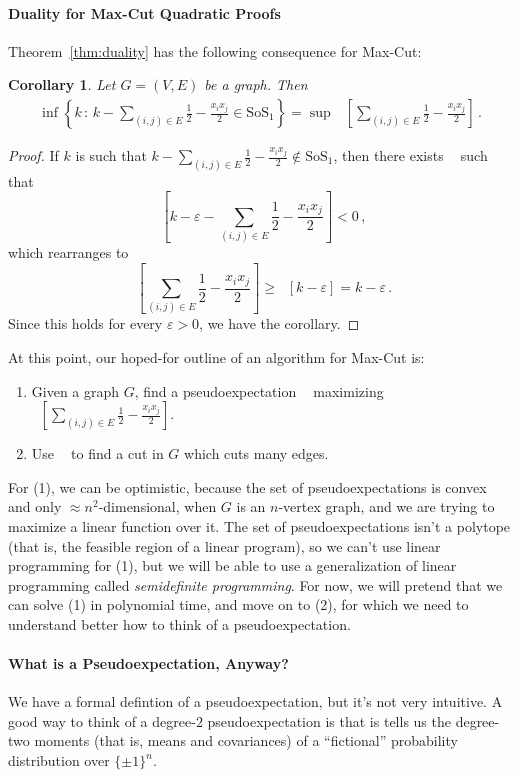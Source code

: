 \documentclass[11pt]{article}
\newtheorem{corollary}[theorem]{Corollary}
\newcommand{\brac}[1]{\left[ #1 \right]}
\renewcommand{\epsilon}{\varepsilon}
\newcommand{\eps}{\epsilon}
\DeclareMathOperator{\pE}{\widetilde{\mathbb{E}}} %
\newcommand{\SoS}{\text{SoS}}
\begin{document}
\paragraph{Duality for Max-Cut Quadratic Proofs}
Theorem~\ref{thm:duality} has the following consequence for Max-Cut:
\begin{corollary}
Let $G = (V,E)$ be a graph.
Then
\begin{align*}
  \inf \left \{ k \, : \,  k - \sum_{(i,j) \in E} \frac 12 - \frac{x_i x_j}{2}  \in \SoS_1 \right \} 
  = \sup \,  \pE \brac{ \sum_{(i,j) \in E} \frac 12 - \frac{x_i x_j}{2}} \, .
\end{align*}
\end{corollary}
\begin{proof}
  If $k$ is such that $k - \sum_{(i,j) \in E} \tfrac 12 - \tfrac{x_i x_j}{2} \notin \SoS_1$, then there exists $\pE$ such that
  \[
  \pE \brac{k - \eps - \sum_{(i,j) \in E} \frac 12 - \frac{x_i x_j}{2}} < 0 \, ,
  \]
  which rearranges to 
  \[
    \pE \brac{\sum_{(i,j) \in E} \frac 12 - \frac{x_i x_j}{2}} \geq \pE[k-\eps] = k -\eps \, . 
  \]
  Since this holds for every $\eps > 0$, we have the corollary.
\end{proof}

At this point, our hoped-for outline of an algorithm for Max-Cut is:
\begin{enumerate}
\item Given a graph $G$, find a pseudoexpectation $\pE$ maximizing $\pE[ \sum_{(i,j) \in E} \tfrac 12 - \tfrac{x_i x_j}{2}]$.
\item Use $\pE$ to find a cut in $G$ which cuts many edges.
\end{enumerate}

For (1), we can be optimistic, because the set of pseudoexpectations is convex and only $\approx n^2$-dimensional, when $G$ is an $n$-vertex graph, and we are trying to maximize a linear function over it.
The set of pseudoexpectations isn't a polytope (that is, the feasible region of a linear program), so we can't use linear programming for (1), but we will be able to use a generalization of linear programming called \emph{semidefinite programming}.
For now, we will pretend that we can solve (1) in polynomial time, and move on to (2), for which we need to understand better how to think of a pseudoexpectation.

\paragraph{What is a Pseudoexpectation, Anyway?}
We have a formal defintion of a pseudoexpectation, but it's not very intuitive.
A good way to think of a degree-$2$ pseudoexpectation is that is tells us the degree-two moments (that is, means and covariances) of a ``fictional'' probability distribution over $\{\pm 1\}^n$.
\end{document}
